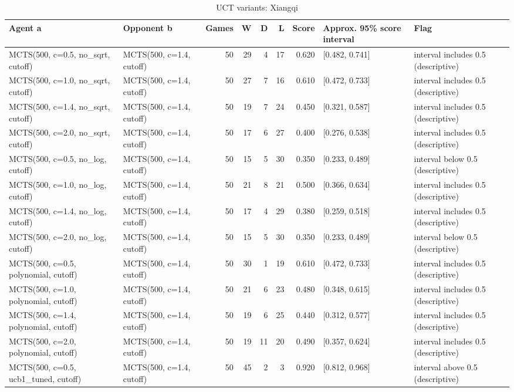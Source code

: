 \begin{table}[!t]
\centering
\caption{UCT variants: Xiangqi}
\label{tab:formula_xiangqi}
\small
\begin{tabular}{llrrrrrll}
\toprule
Agent a & Opponent b & Games & W & D & L & Score & Approx. 95\% score interval & Flag \\
\midrule
MCTS(500, c=0.5, no\_sqrt, cutoff) & MCTS(500, c=1.4, cutoff) & 50 & 29 & 4 & 17 & 0.620 & [0.482, 0.741] & interval includes 0.5 (descriptive) \\
MCTS(500, c=1.0, no\_sqrt, cutoff) & MCTS(500, c=1.4, cutoff) & 50 & 27 & 7 & 16 & 0.610 & [0.472, 0.733] & interval includes 0.5 (descriptive) \\
MCTS(500, c=1.4, no\_sqrt, cutoff) & MCTS(500, c=1.4, cutoff) & 50 & 19 & 7 & 24 & 0.450 & [0.321, 0.587] & interval includes 0.5 (descriptive) \\
MCTS(500, c=2.0, no\_sqrt, cutoff) & MCTS(500, c=1.4, cutoff) & 50 & 17 & 6 & 27 & 0.400 & [0.276, 0.538] & interval includes 0.5 (descriptive) \\
MCTS(500, c=0.5, no\_log, cutoff) & MCTS(500, c=1.4, cutoff) & 50 & 15 & 5 & 30 & 0.350 & [0.233, 0.489] & interval below 0.5 (descriptive) \\
MCTS(500, c=1.0, no\_log, cutoff) & MCTS(500, c=1.4, cutoff) & 50 & 21 & 8 & 21 & 0.500 & [0.366, 0.634] & interval includes 0.5 (descriptive) \\
MCTS(500, c=1.4, no\_log, cutoff) & MCTS(500, c=1.4, cutoff) & 50 & 17 & 4 & 29 & 0.380 & [0.259, 0.518] & interval includes 0.5 (descriptive) \\
MCTS(500, c=2.0, no\_log, cutoff) & MCTS(500, c=1.4, cutoff) & 50 & 15 & 5 & 30 & 0.350 & [0.233, 0.489] & interval below 0.5 (descriptive) \\
MCTS(500, c=0.5, polynomial, cutoff) & MCTS(500, c=1.4, cutoff) & 50 & 30 & 1 & 19 & 0.610 & [0.472, 0.733] & interval includes 0.5 (descriptive) \\
MCTS(500, c=1.0, polynomial, cutoff) & MCTS(500, c=1.4, cutoff) & 50 & 21 & 6 & 23 & 0.480 & [0.348, 0.615] & interval includes 0.5 (descriptive) \\
MCTS(500, c=1.4, polynomial, cutoff) & MCTS(500, c=1.4, cutoff) & 50 & 19 & 6 & 25 & 0.440 & [0.312, 0.577] & interval includes 0.5 (descriptive) \\
MCTS(500, c=2.0, polynomial, cutoff) & MCTS(500, c=1.4, cutoff) & 50 & 19 & 11 & 20 & 0.490 & [0.357, 0.624] & interval includes 0.5 (descriptive) \\
MCTS(500, c=0.5, ucb1\_tuned, cutoff) & MCTS(500, c=1.4, cutoff) & 50 & 45 & 2 & 3 & 0.920 & [0.812, 0.968] & interval above 0.5 (descriptive) \\

\end{tabular}
\end{table}
